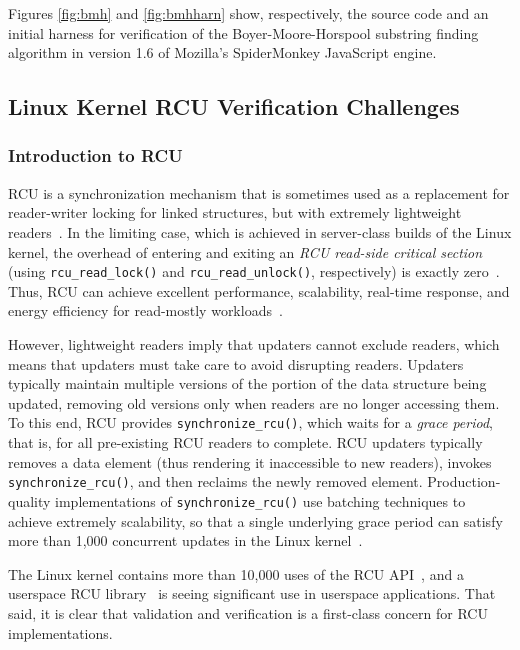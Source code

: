 \documentclass[conference]{IEEEtran}
\newcommand{\co}[1]{\lstinline[breaklines=yes,breakatwhitespace=yes]{#1}}
\begin{document}
Figures \ref{fig:bmh} and \ref{fig:bmhharn} show, respectively, the
source code and an initial harness for verification of the
Boyer-Moore-Horspool substring finding algorithm \cite{BMH,CFV13} in
version 1.6 of Mozilla's SpiderMonkey JavaScript engine.

\subsection{Linux Kernel RCU Verification Challenges}

\subsubsection{Introduction to RCU}
\label{sec:Introduction to RCU}

RCU is a synchronization mechanism that is sometimes used as a replacement
for reader-writer locking for linked structures, but with extremely
lightweight readers~\cite{McKenney:2013:SDS:2483852.2483867}.
In the limiting case, which is achieved in server-class builds of the
Linux kernel, the overhead of entering and exiting an \emph{RCU read-side
critical section} (using \co{rcu_read_lock()} and \co{rcu_read_unlock()},
respectively) is exactly zero~\cite{McKenney98}.
Thus, RCU can achieve excellent performance, scalability, real-time
response, and energy efficiency for read-mostly
workloads~\cite{McKenney:2013:SDS:2483852.2483867,DinakarGuniguntala2008IBMSysJ,PaulMcKenney2013AMPenergyHOTPAR}.

However, lightweight readers imply that updaters cannot exclude readers,
which means that updaters must take care to avoid disrupting readers.
Updaters typically maintain multiple versions of the portion of the
data structure being updated, removing old versions only when
readers are no longer accessing them.
To this end, RCU provides \co{synchronize_rcu()}, which waits for a
\emph{grace period}, that is, for all pre-existing RCU readers to complete.
RCU updaters typically removes a data element (thus rendering it
inaccessible to new readers), invokes \co{synchronize_rcu()},
and then reclaims the newly removed element.
Production-quality implementations of \co{synchronize_rcu()} use batching
techniques to achieve extremely scalability, so that a single underlying
grace period can satisfy more than 1,000 concurrent updates in the
Linux kernel~\cite{Sarma04c}.

The Linux kernel contains more than 10,000 uses of the RCU
API~\cite{PaulEMcKenneyRCUusagePage}, and a userspace RCU
library~\cite{MathieuDesnoyers2009URCU,MathieuDesnoyers2012URCU}
is seeing significant use in userspace applications.
That said, it is clear that validation and verification is a first-class
concern for RCU implementations.
\end{document}
